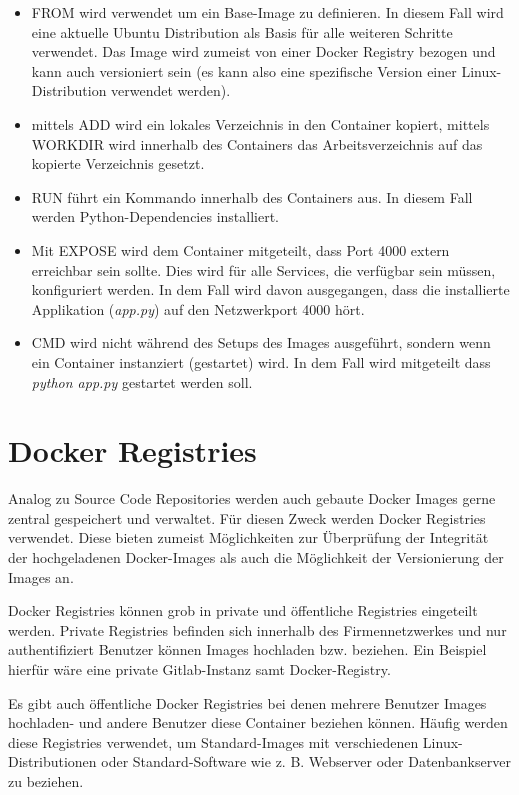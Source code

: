 \begin{itemize}
	\item FROM wird verwendet um ein Base-Image zu definieren. In diesem Fall wird eine aktuelle Ubuntu Distribution als Basis für alle weiteren Schritte verwendet. Das Image wird zumeist von einer Docker Registry bezogen und kann auch versioniert sein (es kann also eine spezifische Version einer Linux-Distribution verwendet werden).
	\item mittels ADD wird ein lokales Verzeichnis in den Container kopiert, mittels WORKDIR wird innerhalb des Containers das Arbeitsverzeichnis auf das kopierte Verzeichnis gesetzt.
	\item RUN führt ein Kommando innerhalb des Containers aus. In diesem Fall werden Python-Dependencies installiert.
	\item Mit EXPOSE wird dem Container mitgeteilt, dass Port 4000 extern erreichbar sein sollte. Dies wird für alle Services, die verfügbar sein müssen, konfiguriert werden. In dem Fall wird davon ausgegangen, dass die installierte Applikation (\textit{app.py}) auf den Netzwerkport 4000 hört.
	\item CMD wird nicht während des Setups des Images ausgeführt, sondern wenn ein Container instanziert (gestartet) wird. In dem Fall wird mitgeteilt dass \textit{python app.py} gestartet werden soll.
\end{itemize}

\section{Docker Registries}

Analog zu Source Code Repositories werden auch gebaute Docker Images gerne zentral gespeichert und verwaltet. Für diesen Zweck werden Docker Registries verwendet. Diese bieten zumeist Möglichkeiten zur Überprüfung der Integrität der hochgeladenen Docker-Images als auch die Möglichkeit der Versionierung der Images an.

Docker Registries können grob in private und öffentliche Registries eingeteilt werden. Private Registries befinden sich innerhalb des Firmennetzwerkes und nur authentifiziert Benutzer können Images hochladen bzw. beziehen. Ein Beispiel hierfür wäre eine private Gitlab-Instanz samt Docker-Registry.

Es gibt auch öffentliche Docker Registries bei denen mehrere Benutzer Images hochladen- und andere Benutzer diese Container beziehen können. Häufig werden diese Registries verwendet, um Standard-Images mit verschiedenen Linux-Distributionen oder Standard-Software wie z. B. Webserver oder Datenbankserver zu beziehen.

